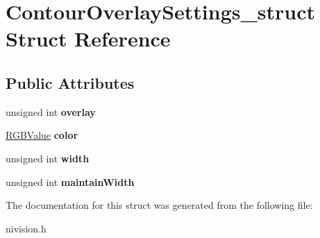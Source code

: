 \hypertarget{structContourOverlaySettings__struct}{
\section{ContourOverlaySettings\_\-struct Struct Reference}
\label{structContourOverlaySettings__struct}
}
\subsection*{Public Attributes}
\begin{DoxyCompactItemize}
\item 
\hypertarget{structContourOverlaySettings__struct_ac8820ba39aecaa697cf409c2c3ac6761}{
unsigned int {\bfseries overlay}}
\label{structContourOverlaySettings__struct_ac8820ba39aecaa697cf409c2c3ac6761}

\item 
\hypertarget{structContourOverlaySettings__struct_a3198c86f1997792adb9a41b9a966f344}{
\hyperlink{structRGBValue__struct}{RGBValue} {\bfseries color}}
\label{structContourOverlaySettings__struct_a3198c86f1997792adb9a41b9a966f344}

\item 
\hypertarget{structContourOverlaySettings__struct_ad8c5109b8c684bc494f04ef54d928c19}{
unsigned int {\bfseries width}}
\label{structContourOverlaySettings__struct_ad8c5109b8c684bc494f04ef54d928c19}

\item 
\hypertarget{structContourOverlaySettings__struct_a8a67740fb49c8b20324275d8c707b501}{
unsigned int {\bfseries maintainWidth}}
\label{structContourOverlaySettings__struct_a8a67740fb49c8b20324275d8c707b501}

\end{DoxyCompactItemize}


The documentation for this struct was generated from the following file:\begin{DoxyCompactItemize}
\item 
nivision.h\end{DoxyCompactItemize}
